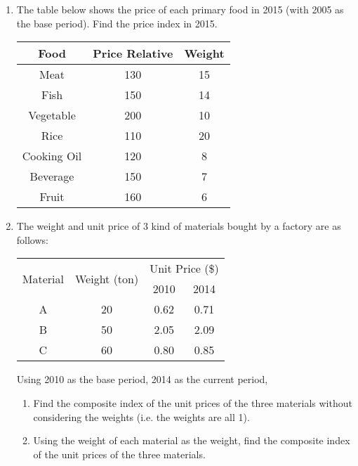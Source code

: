 \documentclass{report}
\begin{document}
\begin{multicols}{2}
\begin{enumerate}
    \item The table below shows the price of each primary food in 2015 (with 2005 as the
          base period). Find the price index in 2015.
          \begin{center}
            \begin{tabular}{|c|c|c|}
              \hline
              Food        & Price Relative & Weight \\
              \hline
              Meat        & 130            & 15     \\
              Fish        & 150            & 14     \\
              Vegetable   & 200            & 10     \\
              Rice        & 110            & 20     \\
              Cooking Oil & 120            & 8      \\
              Beverage    & 150            & 7      \\
              Fruit       & 160            & 6      \\
              \hline
            \end{tabular}
          \end{center}

    \item The weight and unit price of 3 kind of materials bought by a factory are as
          follows:
          \begin{center}
            \begin{tabular}{|c|c|c|c|}
              \hline
              \multirow{2}{*}{Material} & \multirow{2}{*}{Weight (ton)} & \multicolumn{2}{c|}{Unit Price (\$)}        \\
              \cline{3-4}
                                        &                               & 2010                                 & 2014 \\
              \hline
              A                         & 20                            & 0.62                                 & 0.71 \\
              B                         & 50                            & 2.05                                 & 2.09 \\
              C                         & 60                            & 0.80                                 & 0.85 \\
              \hline
            \end{tabular}
          \end{center}
          Using 2010 as the base period, 2014 as the current period,
          \begin{enumerate}
            \item Find the composite index of the unit prices of the three materials without
                  considering the weights (i.e. the weights are all 1).
            \item Using the weight of each material as the weight, find the composite index of
                  the unit prices of the three materials.
          \end{enumerate}


\end{enumerate}
\end{multicols}
\end{document}
